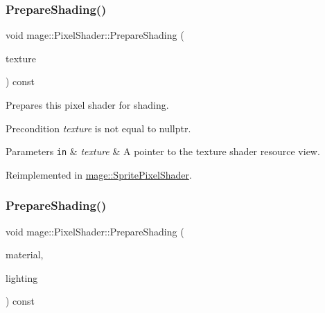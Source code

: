 \subsubsection{\texorpdfstring{Prepare\+Shading()}{PrepareShading()}\hspace{0.1cm}{\footnotesize\ttfamily [1/2]}}
{\footnotesize\ttfamily void mage\+::\+Pixel\+Shader\+::\+Prepare\+Shading (\begin{DoxyParamCaption}\item[{I\+D3\+D11\+Shader\+Resource\+View $\ast$}]{texture }\end{DoxyParamCaption}) const\hspace{0.3cm}{\ttfamily [virtual]}}

Prepares this pixel shader for shading.

\begin{DoxyPrecond}{Precondition}
{\itshape texture} is not equal to {\ttfamily nullptr}. 
\end{DoxyPrecond}

\begin{DoxyParams}[1]{Parameters}
\mbox{\tt in}  & {\em texture} & A pointer to the texture shader resource view. \\
\hline
\end{DoxyParams}


Reimplemented in \hyperlink{classmage_1_1_sprite_pixel_shader_a8c0c4daf36c74822a772b1a38e8d876a}{mage\+::\+Sprite\+Pixel\+Shader}.

\hypertarget{classmage_1_1_pixel_shader_a5a1a58bcb0ed64405e746ec7a5af5269}{}\label{classmage_1_1_pixel_shader_a5a1a58bcb0ed64405e746ec7a5af5269} 
\subsubsection{\texorpdfstring{Prepare\+Shading()}{PrepareShading()}\hspace{0.1cm}{\footnotesize\ttfamily [2/2]}}
{\footnotesize\ttfamily void mage\+::\+Pixel\+Shader\+::\+Prepare\+Shading (\begin{DoxyParamCaption}\item[{const \hyperlink{structmage_1_1_material}{Material} \&}]{material,  }\item[{const \hyperlink{structmage_1_1_lighting}{Lighting} \&}]{lighting }\end{DoxyParamCaption}) const\hspace{0.3cm}{\ttfamily [virtual]}}

